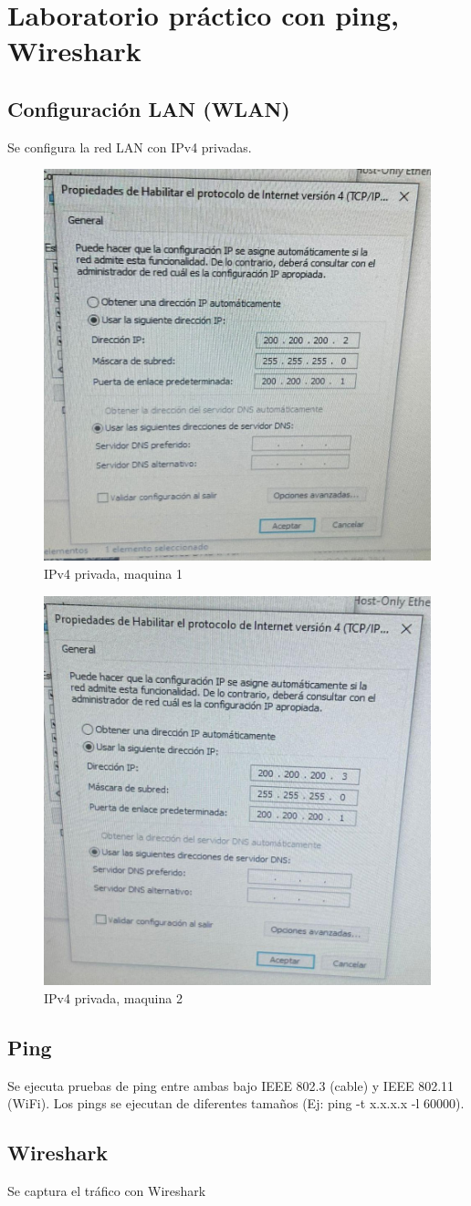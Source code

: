 \section{Laboratorio práctico con ping, Wireshark}
\subsection{Configuración LAN (WLAN)}
Se configura la red LAN con IPv4 privadas.
\begin{figure}[H]
    \centering
    \includegraphics[width=0.75\columnwidth]{punto1/p1_a.jpeg}
    \caption{IPv4 privada, maquina 1}
    \label{fig:ipv4_a}
\end{figure}

\begin{figure}[H]
    \centering
    \includegraphics[width=0.75\columnwidth]{punto1/p1_b.jpeg}
    \caption{IPv4 privada, maquina 2}
    \label{fig:ipv4_b}
\end{figure}

\subsection{Ping}
Se ejecuta pruebas de ping entre ambas bajo IEEE 802.3 (cable) y IEEE 802.11 (WiFi). Los pings se ejecutan de diferentes tamaños (Ej: ping -t x.x.x.x -l 60000).\\



\subsection{Wireshark}
Se captura el tráfico con Wireshark


